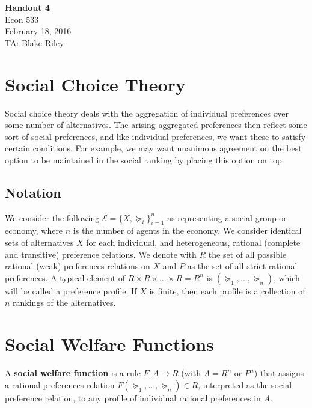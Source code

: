 \documentclass[10pt]{article}
\def\HandoutNumber{4}
\def\TheDate{February 18, 2016}
\def\Name{Blake Riley}
\begin{document}
\begin{spacing}{1.0}

\noindent
\textbf{Handout \HandoutNumber} \\
Econ 533 \\
\TheDate \\
TA: \Name \\

\section{Social Choice Theory}

Social choice theory deals with the aggregation of
individual preferences over some number of
alternatives. The arising aggregated preferences then
reflect some sort of social preferences, and like
individual preferences, we want these to satisfy certain
conditions. For example, we may want unanimous agreement
on the best option to be maintained in the social ranking
by placing this option on top.

\subsection{Notation}

We consider the following $\mathcal{E} = \{X,
\succeq_i\}_{i=1}^n$ as representing a social group or
economy, where $n$ is the number of agents in the
economy. We consider identical sets of alternatives $X$
for each individual, and heterogeneous, rational
(complete and transitive) preference relations. We denote
with $R$ the set of all possible rational (weak)
preferences relations on $X$ and $P$ as the set of all
strict rational preferences. A typical element of $R
\times R \times \ldots \times R = R^n$ is $(\succeq_1,
\ldots, \succeq_n)$, which will be called a preference
profile. If $X$ is finite, then each profile is a
collection of $n$ rankings of the alternatives.

\section{Social Welfare Functions}

\begin{definition}
  A \textbf{social welfare function} is a rule $F: A\to
  R$ (with $A= R^n$ or $P^n$) that assigns a rational
  preferences relation $F(\succeq_1, \ldots, \succeq_n)
  \in R$, interpreted as the social preference relation,
  to any profile of individual rational preferences in $A$.
\end{definition}


\end{spacing}
\end{document}
